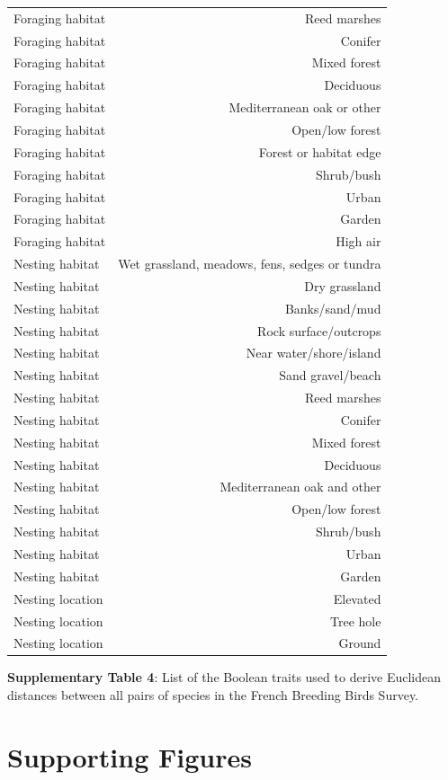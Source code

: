 \begin{longtable}[]{@{}lr@{}}
Foraging habitat & Reed marshes\tabularnewline
Foraging habitat & Conifer\tabularnewline
Foraging habitat & Mixed forest\tabularnewline
Foraging habitat & Deciduous\tabularnewline
Foraging habitat & Mediterranean oak or other\tabularnewline
Foraging habitat & Open/low forest\tabularnewline
Foraging habitat & Forest or habitat edge\tabularnewline
Foraging habitat & Shrub/bush\tabularnewline
Foraging habitat & Urban\tabularnewline
Foraging habitat & Garden\tabularnewline
Foraging habitat & High air\tabularnewline
Nesting habitat & Wet grassland, meadows, fens, sedges or
tundra\tabularnewline
Nesting habitat & Dry grassland\tabularnewline
Nesting habitat & Banks/sand/mud\tabularnewline
Nesting habitat & Rock surface/outcrops\tabularnewline
Nesting habitat & Near water/shore/island\tabularnewline
Nesting habitat & Sand gravel/beach\tabularnewline
Nesting habitat & Reed marshes\tabularnewline
Nesting habitat & Conifer\tabularnewline
Nesting habitat & Mixed forest\tabularnewline
Nesting habitat & Deciduous\tabularnewline
Nesting habitat & Mediterranean oak and other\tabularnewline
Nesting habitat & Open/low forest\tabularnewline
Nesting habitat & Shrub/bush\tabularnewline
Nesting habitat & Urban\tabularnewline
Nesting habitat & Garden\tabularnewline
Nesting location & Elevated\tabularnewline
Nesting location & Tree hole\tabularnewline
Nesting location & Ground\tabularnewline
\bottomrule
\end{longtable}

\textbf{Supplementary Table 4}: List of the Boolean traits used to
derive Euclidean distances between all pairs of species in the French
Breeding Birds Survey.

\newpage

\section{Supporting Figures}\label{supporting-figures}

